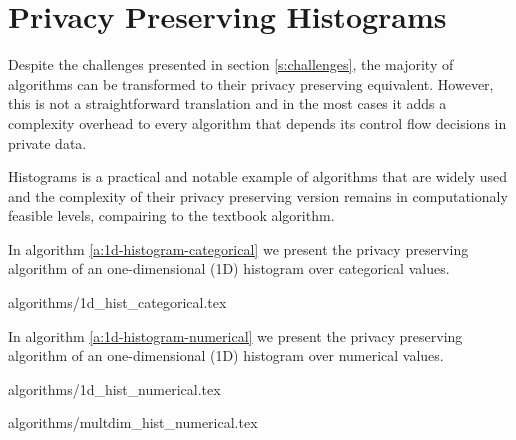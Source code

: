 \section{Privacy Preserving Histograms}\label{s:histograms}
Despite the challenges presented in section \ref{s:challenges}, the majority of algorithms can be transformed to their privacy preserving equivalent.
However, this is not a straightforward translation and in the most cases it adds a complexity overhead to every algorithm that depends its control flow decisions in private data.

Histograms is a practical and notable example of algorithms that are widely used and the complexity of their privacy preserving version remains in computationaly feasible levels, compairing to the textbook algorithm.







In algorithm \ref{a:1d-histogram-categorical} we present the privacy preserving algorithm of an one-dimensional (1D) histogram over categorical values.

{algorithms/1d_hist_categorical.tex}




In algorithm \ref{a:1d-histogram-numerical} we present the privacy preserving algorithm of an one-dimensional (1D) histogram over numerical values.

{algorithms/1d_hist_numerical.tex}



{algorithms/multdim_hist_numerical.tex}
